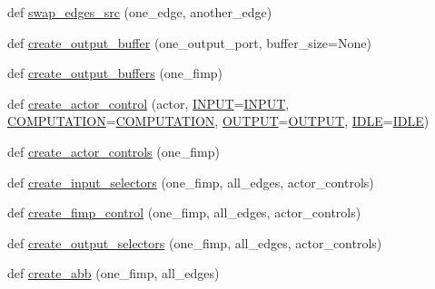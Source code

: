 \begin{DoxyCompactItemize}
def \hyperlink{namespacesylva_1_1glic_1_1glic_a6e0ff8a8e5ef9956ef0b31be0fb0bf0e}{swap\+\_\+edges\+\_\+src} (one\+\_\+edge, another\+\_\+edge)
\item 
def \hyperlink{namespacesylva_1_1glic_1_1glic_a414741c04de0838d506dbeee050368a6}{create\+\_\+output\+\_\+buffer} (one\+\_\+output\+\_\+port, buffer\+\_\+size=None)
\item 
def \hyperlink{namespacesylva_1_1glic_1_1glic_a53c55762a3c7d476be7ee748baeccbeb}{create\+\_\+output\+\_\+buffers} (one\+\_\+fimp)
\item 
def \hyperlink{namespacesylva_1_1glic_1_1glic_ae31a233cafcb3a83bd369c491b133b91}{create\+\_\+actor\+\_\+control} (actor, \hyperlink{namespacesylva_1_1glic_1_1glic_ab7e66a35c60e9c2fbeb69191240a7dc9}{I\+N\+P\+UT}=\hyperlink{namespacesylva_1_1glic_1_1glic_ab7e66a35c60e9c2fbeb69191240a7dc9}{I\+N\+P\+UT}, \hyperlink{namespacesylva_1_1glic_1_1glic_a7ed9d88425bdb7584d63853dc31381f2}{C\+O\+M\+P\+U\+T\+A\+T\+I\+ON}=\hyperlink{namespacesylva_1_1glic_1_1glic_a7ed9d88425bdb7584d63853dc31381f2}{C\+O\+M\+P\+U\+T\+A\+T\+I\+ON}, \hyperlink{namespacesylva_1_1glic_1_1glic_ad6e11d2ff626d576dddd38f99952a31a}{O\+U\+T\+P\+UT}=\hyperlink{namespacesylva_1_1glic_1_1glic_ad6e11d2ff626d576dddd38f99952a31a}{O\+U\+T\+P\+UT}, \hyperlink{namespacesylva_1_1glic_1_1glic_ada3197b7ecf6f2b781f0f358b482a2b4}{I\+D\+LE}=\hyperlink{namespacesylva_1_1glic_1_1glic_ada3197b7ecf6f2b781f0f358b482a2b4}{I\+D\+LE})
\item 
def \hyperlink{namespacesylva_1_1glic_1_1glic_a0b179ee41ee4494cf7450be4ca272db4}{create\+\_\+actor\+\_\+controls} (one\+\_\+fimp)
\item 
def \hyperlink{namespacesylva_1_1glic_1_1glic_a28f028a55874a8d890d0df58905da73b}{create\+\_\+input\+\_\+selectors} (one\+\_\+fimp, all\+\_\+edges, actor\+\_\+controls)
\item 
def \hyperlink{namespacesylva_1_1glic_1_1glic_a1cdd3394b53489429bc51c8206e1180e}{create\+\_\+fimp\+\_\+control} (one\+\_\+fimp, all\+\_\+edges, actor\+\_\+controls)
\item 
def \hyperlink{namespacesylva_1_1glic_1_1glic_a7eb9347832747ffffb52851a1ee2d08f}{create\+\_\+output\+\_\+selectors} (one\+\_\+fimp, all\+\_\+edges, actor\+\_\+controls)
\item 
def \hyperlink{namespacesylva_1_1glic_1_1glic_a3a984424c11a0b4b6ac8890135ccbfe9}{create\+\_\+abb} (one\+\_\+fimp, all\+\_\+edges)
\end{DoxyCompactItemize}
